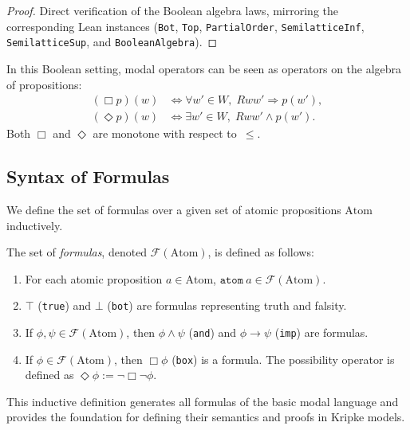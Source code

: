 \begin{proof}
    \label{proof:boolean-structure}
  \leanok
  Direct verification of the Boolean algebra laws, mirroring the
  corresponding Lean instances (\texttt{Bot}, \texttt{Top},
  \texttt{PartialOrder}, \texttt{SemilatticeInf},
  \texttt{SemilatticeSup}, and \texttt{BooleanAlgebra}).
\end{proof}

In this Boolean setting, modal operators can be seen as operators on
the algebra of propositions:
  \begin{align*}
    (\Box p)(w) &\iff \forall w' \in W,\; Rww' \Rightarrow p(w'), \\
    (\Diamond p)(w) &\iff \exists w' \in W,\; Rww' \wedge p(w').
  \end{align*}
  Both $\Box$ and $\Diamond$ are monotone with respect to~$\leq$.


\subsection{Syntax of Formulas}

We define the set of formulas over a given set of atomic propositions $\mathrm{Atom}$ inductively.  

\begin{definition}
    \label{formulas}
  \leanok
The set of \emph{formulas}, denoted $\mathcal{F}(\mathrm{Atom})$, is defined as follows:
\begin{enumerate}
  \item For each atomic proposition $a \in \mathrm{Atom}$, $\mathtt{atom}\ a \in \mathcal{F}(\mathrm{Atom})$.
  \item $\top$ (\texttt{true}) and $\bot$ (\texttt{bot}) are formulas representing truth and falsity.
  \item If $\phi, \psi \in \mathcal{F}(\mathrm{Atom})$, then $\phi \wedge \psi$ (\texttt{and}) and $\phi \to \psi$ (\texttt{imp}) are formulas.
  \item If $\phi \in \mathcal{F}(\mathrm{Atom})$, then $\Box \phi$ (\texttt{box}) is a formula. The possibility operator is defined as $\Diamond \phi := \neg \Box \neg \phi$.
\end{enumerate}
\end{definition}
This inductive definition generates all formulas of the basic modal language and provides the foundation for defining their semantics and proofs in Kripke models.



